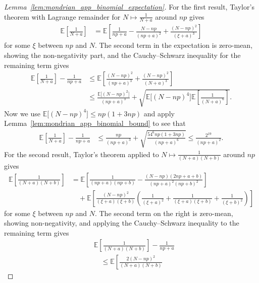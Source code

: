 \documentclass[11pt,lof]{puthesis}
\newcommand{\E}{\ensuremath{\mathbb{E}}}
\theoremstyle{break}
\theoremstyle{proof}
\newtheorem{proof}{Proof}
\begin{document}
\begin{proof}[Lemma~\ref{lem:mondrian_app_binomial_expectation}]
  For the first result,
  Taylor's theorem with Lagrange remainder
  for $N \mapsto \frac{1}{N+a}$ around $n p$ gives
  \begin{align*}
    \E \left[
      \frac{1}{N+a}
    \right]
    &=
    \E \left[
      \frac{1}{n p+a}
      - \frac{N - n p}{(n p+a)^2}
      + \frac{(N - n p)^2}{(\xi+a)^3}
    \right]
  \end{align*}
  for some $\xi$ between $n p$ and $N$. The second term in the expectation
  is zero-mean, showing the non-negativity part, and the
  Cauchy--Schwarz inequality for the remaining term gives
  \begin{align*}
    \E \left[
      \frac{1}{N+a}
    \right]
    - \frac{1}{n p+a}
    &\leq
    \E \left[
      \frac{(N - n p)^2}{(n p+a)^3}
      + \frac{(N - n p)^2}{(N+a)^3}
    \right] \\
    &\leq
    \frac{\E\big[(N - n p)^2\big]}{(n p+a)^3}
    + \sqrt{
      \E\big[(N - n p)^4\big]
      \E \left[
        \frac{1}{(N+a)^6}
    \right]}.
  \end{align*}
  Now we use $\E\big[(N - n p)^4\big] \leq n p(1+3n p)$
  and apply Lemma~\ref{lem:mondrian_app_binomial_bound} to see that
  \begin{align*}
    \E \left[
      \frac{1}{N+a}
    \right]
    - \frac{1}{n p+a}
    &\leq
    \frac{n p}{(n p+a)^3}
    + \sqrt{\frac{54^6 n p(1+3 n p)}{(n p + a)^6}}
    \leq
    \frac{2^{19}}{(n p+a)^2}.
  \end{align*}
  For the second result,
  Taylor's theorem applied to $N \mapsto \frac{1}{(N+a)(N+b)}$
  around $n p$ gives
  \begin{align*}
    \E \left[
      \frac{1}{(N+a)(N+b)}
    \right]
    &=
    \E \left[
      \frac{1}{(n p+a)(n p + b)}
      - \frac{(N - n p)(2 n p + a + b)}{(n p + a)^2 (n p + b)^2}
    \right] \\
    &\quad+
    \E \left[
      \frac{(N - n p)^2}{(\xi+a)(\xi+b)}
      \left(
        \frac{1}{(\xi + a)^2}
        + \frac{1}{(\xi + a)(\xi + b)}
        + \frac{1}{(\xi + b)^2}
      \right)
    \right]
  \end{align*}
  for some $\xi$ between $n p$ and $N$. The second term on the right is
  zero-mean, showing non-negativity, and applying the Cauchy--Schwarz
  inequality to the remaining term gives
  \begin{align*}
    &\E \left[
      \frac{1}{(N+a)(N+b)}
    \right]
    - \frac{1}{n p+a} \\
    &\quad\leq
    \E \left[
      \frac{2 (N - n p)^2}{(N+a)(N+b)}

\end{align*}
\end{proof}
\end{document}
